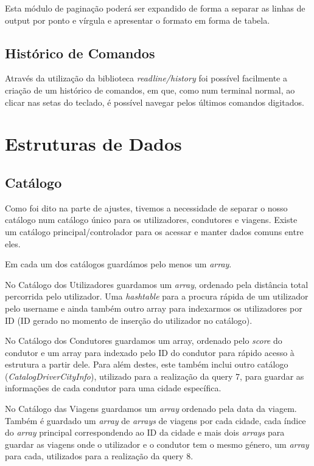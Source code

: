 \documentclass{article}
\begin{document}
            Esta módulo de paginação poderá ser expandido de forma a separar as linhas
            de output por ponto e vírgula e apresentar o formato em forma de tabela.
        \subsection{Histórico de Comandos}
            Através da utilização da biblioteca \emph{readline/history} foi possível
            facilmente a criação de um histórico de comandos, em que, como num terminal
            normal, ao clicar nas setas do teclado, é possível navegar pelos últimos
            comandos digitados.
            
    \section{Estruturas de Dados}
        \subsection{Catálogo}
            Como foi dito na parte de ajustes, tivemos a necessidade de separar o nosso
            catálogo num catálogo único para os utilizadores, condutores e viagens.
            Existe um catálogo principal/controlador para os acessar e manter dados comuns entre eles.

            Em cada um dos catálogos guardámos pelo menos um \textit{array}.
            
            No Catálogo dos Utilizadores guardamos um \textit{array}, ordenado pela distância total percorrida
            pelo utilizador. Uma \textit{hashtable} para a procura rápida de um utilizador pelo username e
            ainda também outro array para indexarmos os utilizadores por ID (ID gerado no
            momento de inserção do utilizador no catálogo).
			
            No Catálogo dos Condutores guardamos um array, ordenado pelo \emph{score} do condutor e
            um array para indexado pelo ID do condutor para rápido acesso à estrutura a partir dele.
            Para além destes, este também inclui outro catálogo (\textit{CatalogDriverCityInfo}), utilizado para a realização da query 7, 
            para guardar as informações de cada condutor para uma cidade 
            específica.
			
            No Catálogo das Viagens guardamos um \textit{array} ordenado pela data da viagem. 
            Também é guardado um \textit{array} de \textit{arrays} de viagens por cada cidade, cada índice
            do \textit{array} principal correspondendo ao ID da cidade e mais dois \textit{arrays} para guardar
            as viagens onde o utilizador e o condutor tem o mesmo género, um \textit{array} para cada,
            utilizados para a realização da query 8.
            
\end{document}
